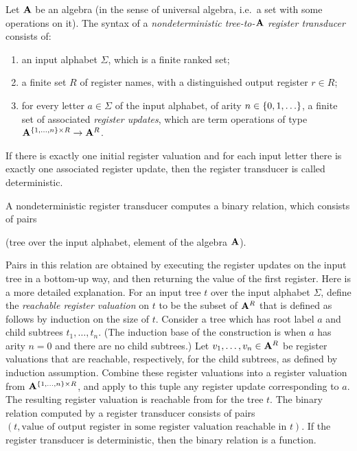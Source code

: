 \begin{definition} \label{def:register-transducer} Let $\mathbf{A}$ be an algebra (in the sense of universal algebra, i.e.~a set with some operations on it). The syntax of a  \emph{nondeterministic tree-to-$\mathbf{A}$ register transducer} consists of:
    \begin{enumerate}
        \item an input alphabet $\Sigma$, which is a finite ranked set;
        \item a finite set $R$ of register names, with a distinguished output register $r \in R$;
        \item for every letter $a \in \Sigma$ of the input alphabet, of arity $n \in \{0,1,\ldots\}$, a finite set of  associated \emph{register updates}, which are  term operations of type  $\mathbf{A}^{\{1,\ldots,n\} \times R} \to \mathbf{A}^R$. 
    \end{enumerate}
    If there is exactly one initial register valuation and for each input letter there is exactly one associated register update, then the register transducer is called deterministic. 
\end{definition}


A nondeterministic register transducer computes a binary relation, which consists of pairs 
\begin{center}
    (tree over the input alphabet, element of the algebra $\mathbf{A}$).
\end{center}
Pairs in this relation are obtained by  executing the register updates on the input tree in a bottom-up way, and then returning the value of the first register. Here is a more detailed explanation.  For an input  tree $t$ over the input alphabet $\Sigma$, define the \emph{reachable register valuation} on $t$ to be the subset  of $\mathbf{A}^R$ that is  defined as follows by  induction on the size of $t$. Consider a tree which has root label $a$ and child subtrees $t_1,\ldots,t_n$. (The induction base of the construction is when $a$ has arity $n=0$ and there are no child subtrees.) Let $v_1,\ldots,v_n \in \mathbf{A}^R$ be  register valuations that are reachable, respectively,  for the child subtrees, as defined by induction assumption. Combine these register valuations into a register valuation from $\mathbf{A}^{\{1,\ldots,n\} \times R}$, and apply to this tuple any register update corresponding to $a$. The resulting register valuation is reachable from for the tree $t$. The binary relation computed by a register transducer consists of pairs $(t,\text{value of output register in  some register valuation reachable in $t$})$. If the register transducer is deterministic, then the binary relation is a function. 


